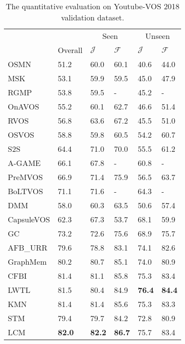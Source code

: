 \documentclass[final]{cvpr}
\begin{document}
\begin{table}
	\centering
	\begin{center}
\begin{tabular}{llllll} 
\hline
   &  &  \multicolumn{2}{c}{Seen} & \multicolumn{2}{c}{Unseen} \\  
   \cline{3-6}
   & Overall & $\mathcal{J}$ & $\mathcal{F}$ & $\mathcal{J}$ & $\mathcal{F}$ \\
\hline
OSMN\cite{osmn}            & 51.2 & 60.0 & 60.1 & 40.6 & 44.0 \\
MSK\cite{msk}              & 53.1 & 59.9 & 59.5 & 45.0 & 47.9 \\
RGMP\cite{rgmp}            & 53.8 & 59.5 & -    & 45.2 & -    \\
OnAVOS\cite{OnAVOS}        & 55.2 & 60.1 & 62.7 & 46.6 & 51.4 \\
RVOS\cite{rvos}            & 56.8 & 63.6 & 67.2 & 45.5 & 51.0 \\
OSVOS\cite{osvos}          & 58.8 & 59.8 & 60.5 & 54.2 & 60.7 \\
S2S\cite{s2s}              & 64.4 & 71.0 & 70.0 & 55.5 & 61.2 \\
A-GAME\cite{agame}         & 66.1 & 67.8 & -    & 60.8 & -    \\
PreMVOS\cite{premvos}      & 66.9 & 71.4 & 75.9 & 56.5 & 63.7 \\
BoLTVOS\cite{boltvos}      & 71.1 & 71.6 & -    & 64.3 & -    \\
DMM\cite{dmmnet}      & 58.0 & 60.3 & 63.5 & 50.6 & 57.4 \\
CapsuleVOS\cite{dmmnet} & 62.3 & 67.3 & 53.7 & 68.1 & 59.9 \\
GC\cite{GC}         & 73.2 & 72.6 & 75.6 & 68.9 & 75.7 \\
AFB\_URR\cite{AFB_URR}     & 79.6 & 78.8 & 83.1 & 74.1 & 82.6 \\
GraphMem\cite{GraphMem}    & 80.2 & 80.7 & 85.1 & 74.0 & 80.9 \\
CFBI\cite{cfbi}            & 81.4 & 81.1 & 85.8 & 75.3 & 83.4 \\
LWTL\cite{LWTL}            & 81.5 & 80.4 & 84.9 & \textbf{76.4} & \textbf{84.4} \\

KMN\cite{KMN}              & 81.4 & 81.4 & 85.6 & 75.3 & 83.3 \\

 
\hline 
STM\cite{STM}              & 79.4 & 79.7 & 84.2 & 72.8 & 80.9 \\
LCM                       & \textbf{82.0}   &  \textbf{82.2}  &  \textbf{86.7}  & 75.7   &  83.4  \\
\hline
\end{tabular}
\end{center} 	\caption{The quantitative evaluation on Youtube-VOS 2018 validation dataset.}
	\label{table:youtubevos}
\end{table}
\end{document}
